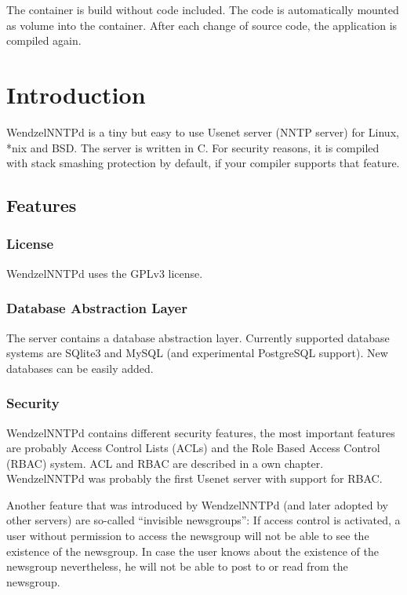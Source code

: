 \documentclass[12pt,fleqn,leqno]{scrbook}
\begin{document}
The container is build without code included. The code is automatically
mounted as volume into the container. After each change of source code,
the application is compiled again.

\hypertarget{introduction}{%
\section{Introduction}\label{introduction}}

WendzelNNTPd is a tiny but easy to use Usenet server (NNTP server) for
Linux, *nix and BSD. The server is written in C. For security reasons,
it is compiled with stack smashing protection by default, if your
compiler supports that feature.

\hypertarget{features}{%
\subsection{Features}\label{features}}

\hypertarget{license}{%
\subsubsection{License}\label{license}}

WendzelNNTPd uses the GPLv3 license.

\hypertarget{database-abstraction-layer}{%
\subsubsection{Database Abstraction
Layer}\label{database-abstraction-layer}}

The server contains a database abstraction layer. Currently supported
database systems are SQlite3 and MySQL (and experimental PostgreSQL
support). New databases can be easily added.

\hypertarget{security}{%
\subsubsection{Security}\label{security}}

WendzelNNTPd contains different security features, the most important
features are probably Access Control Lists (ACLs) and the Role Based
Access Control (RBAC) system. ACL and RBAC are described in a own
chapter. WendzelNNTPd was probably the first Usenet server with support
for RBAC.

Another feature that was introduced by WendzelNNTPd (and later adopted
by other servers) are so-called ``invisible newsgroups'': If access
control is activated, a user without permission to access the newsgroup
will not be able to see the existence of the newsgroup. In case the user
knows about the existence of the newsgroup nevertheless, he will not be
able to post to or read from the newsgroup.
\end{document}
